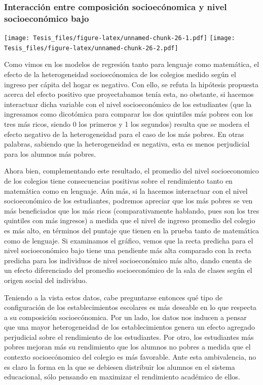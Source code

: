 \documentclass[
]{article}
\begin{document}
\hypertarget{interacciuxf3n-entre-composiciuxf3n-socioecuxf3nomica-y-nivel-socioeconuxf3mico-bajo}{%
\subsubsection{Interacción entre composición socioecónomica y nivel
socioeconómico
bajo}\label{interacciuxf3n-entre-composiciuxf3n-socioecuxf3nomica-y-nivel-socioeconuxf3mico-bajo}}

\texttt{[image: Tesis\_files/figure-latex/unnamed-chunk-26-1.pdf]}
\texttt{[image: Tesis\_files/figure-latex/unnamed-chunk-26-2.pdf]}

Como vimos en los modelos de regresión tanto para lenguaje como
matemática, el efecto de la heterogeneidad socioecónomica de los
colegios medido según el ingreso per cápita del hogar es negativo. Con
ello, se refuta la hipótesis propuesta acerca del efecto positivo que
proyectabamos tenía esta, no obstante, si hacemos interactuar dicha
variable con el nivel socioeconómico de los estudiantes (que la
ingresamos como dicotómica para comparar los dos quintiles más pobres
con los tres más ricos, siendo 0 los primeros y 1 los segundos) resulta
que se modera el efecto negativo de la heterogeneidad para el caso de
los más pobres. En otras palabras, sabiendo que la heterogeneidad es
negativa, esta es menos perjudicial para los alumnos más pobres.

Ahora bien, complementando este resultado, el promedio del nivel
socioeconomico de los colegios tiene consecuencias positivas sobre el
rendimiento tanto en matemática como en lenguaje. Aún más, si la hacemos
interactuar con el nivel socioeconómico de los estudiantes, podremos
apreciar que los más pobres se ven más beneficiados que los más ricos
(comparativamente hablando, pues son los tres quintiles con más
ingresos) a medida que el nivel de ingreso promedio del colegio es más
alto, en términos del puntaje que tienen en la prueba tanto de
matemática como de lenguaje. Si examinamos el gráfico, vemos que la
recta predicha para el nivel socioeconómico bajo tiene una pendiente más
alta comparado con la recta predicha para los individuos de nivel
socioeconómico más alto, dando cuenta de un efecto diferenciado del
promedio socioeconómico de la sala de clases según el origen social del
individuo.

Teniendo a la vista estos datos, cabe preguntarse entonces qué tipo de
configuración de los establecimientos escolares es más deseable en lo
que respecta a su composición socioecónomica. Por un lado, los datos nos
inducen a pensar que una mayor heterogeneidad de los establecimientos
genera un efecto agregado perjudicial sobre el rendimiento de los
estudiantes. Por otro, los estudiantes más pobres mejoran más su
rendimiento que los alumnos no pobres a medida que el contexto
socioecónomico del colegio es más favorable. Ante esta ambivalencia, no
es claro la forma en la que se debiesen distribuir los alumnos en el
sistema educacional, sólo pensando en maximizar el rendimiento académico
de ellos.
\end{document}
